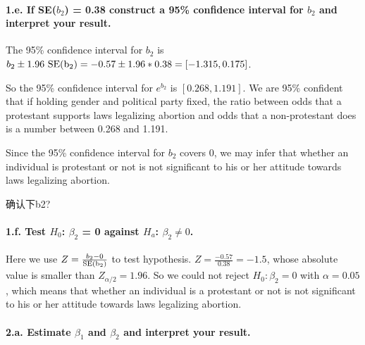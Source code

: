 \documentclass[]{article}
\let\oldparagraph\paragraph
\renewcommand{\paragraph}[1]{\oldparagraph{#1}\mbox{}}
\begin{document}
\hypertarget{e.-if-seb_2-0.38-construct-a-95-confidence-interval-for-b_2-and-interpret-your-result.}{%
\paragraph{\texorpdfstring{1.e. If SE(\(b_2\)) = 0.38 construct a 95\%
confidence interval for \(b_2\) and interpret your
result.}{1.e. If SE(b\_2) = 0.38 construct a 95\% confidence interval for b\_2 and interpret your result.}}\label{e.-if-seb_2-0.38-construct-a-95-confidence-interval-for-b_2-and-interpret-your-result.}}

The 95\% confidence interval for \(b_2\) is
\(b_2 \pm 1.96\ \rm{SE}(b_2) = -0.57 \pm 1.96*0.38 = [-1.315, 0.175]\).

So the 95\% confidence interval for \(e^{b_2}\) is \([0.268, 1.191]\).
We are 95\% confident that if holding gender and political party fixed,
the ratio between odds that a protestant supports laws legalizing
abortion and odds that a non-protestant does is a number between 0.268
and 1.191.

Since the 95\% confidence interval for \(b_2\) covers 0, we may infer
that whether an individual is protestant or not is not significant to
his or her attitude towards laws legalizing abortion.

{确认下b2?}

\hypertarget{f.-test-h_0-beta_2-0-against-h_a-beta_2-neq-0.}{%
\paragraph{\texorpdfstring{1.f. Test \(H_0\): \(\beta_2\) = 0 against
\(H_a\):
\(\beta_2 \neq 0\).}{1.f. Test H\_0: \textbackslash{}beta\_2 = 0 against H\_a: \textbackslash{}beta\_2 \textbackslash{}neq 0.}}\label{f.-test-h_0-beta_2-0-against-h_a-beta_2-neq-0.}}

Here we use \(Z = \frac{b_2 - 0}{\rm{SE}(b_2)}\) to test hypothesis.
\(Z = \frac{-0.57}{0.38} = -1.5\), whose absolute value is smaller than
\(Z_{\alpha/2} = 1.96\). So we could not reject \(H_0: \beta_2 = 0\)
with \(\alpha = 0.05\), which means that whether an individual is a
protestant or not is not significant to his or her attitude towards laws
legalizing abortion.

\hypertarget{a.-estimate-beta_1-and-beta_2-and-interpret-your-result.}{%
\paragraph{\texorpdfstring{2.a. Estimate \(\beta_1\) and \(\beta_2\) and
interpret your
result.}{2.a. Estimate \textbackslash{}beta\_1 and \textbackslash{}beta\_2 and interpret your result.}}\label{a.-estimate-beta_1-and-beta_2-and-interpret-your-result.}}
\end{document}
